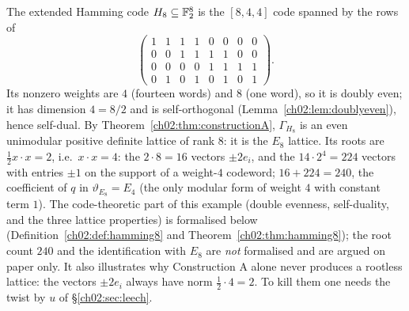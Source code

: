 \begin{example}\label{ch02:ex:e8}
The extended Hamming code $H_8\subseteq\mathbb{F}_2^8$ is the $[8,4,4]$ code spanned by the rows of
\begin{equation*}
\begin{pmatrix}
1&1&1&1&0&0&0&0\\ 0&0&1&1&1&1&0&0\\ 0&0&0&0&1&1&1&1\\ 0&1&0&1&0&1&0&1
\end{pmatrix}.
\end{equation*}
Its nonzero weights are $4$ (fourteen words) and $8$ (one word), so it is doubly even; it has
dimension $4=8/2$ and is self-orthogonal (Lemma~\ref{ch02:lem:doublyeven}), hence self-dual.  By
Theorem~\ref{ch02:thm:constructionA}, $\Gamma_{H_8}$ is an even unimodular positive definite
lattice of rank $8$: it is the $E_8$ lattice.  Its roots are $\tfrac12x\cdot x=2$, i.e.\ $x\cdot
x=4$: the $2\cdot8=16$ vectors $\pm2e_i$, and the $14\cdot2^4=224$ vectors with entries $\pm1$ on
the support of a weight-$4$ codeword; $16+224=240$, the coefficient of $q$ in $\vartheta_{E_8}=E_4$
(the only modular form of weight $4$ with constant term $1$).  The code-theoretic part of this
example (double evenness, self-duality, and the three lattice properties) is formalised below
(Definition~\ref{ch02:def:hamming8} and Theorem~\ref{ch02:thm:hamming8}); the root count $240$ and the
identification with $E_8$ are \emph{not} formalised and are argued on paper only.  It also illustrates why Construction A alone never produces a rootless lattice: the
vectors $\pm2e_i$ always have norm $\tfrac12\cdot4=2$.  To kill them one needs the twist by $u$ of
\S\ref{ch02:sec:leech}.
\end{example}

